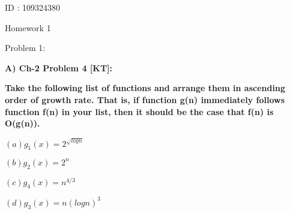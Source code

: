 \documentclass[letterpaper,portrait,12pt]{article}
\begin{document}
\begin{center}
{\huge ID : 109324380}
\end{center}


\begin{center}
{\huge \newpage
}
\end{center}


\begin{center}

\end{center}


\begin{center}
{\huge Homework 1}
\end{center}


\begin{flushleft}
Problem 1:
\end{flushleft}


\begin{flushleft}

\end{flushleft}


\begin{flushleft}
\textbf{A) Ch-2 Problem 4 [KT]:}
\end{flushleft}


\begin{flushleft}
\textbf{	Take the following list of functions and arrange them in ascending order of growth rate. That is, if function g(n) immediately follows function f(n) in your list, then it should be the case that f(n) is O(g(n)).}
\end{flushleft}


\begin{flushleft}

\end{flushleft}


\begin{flushleft}
$(a)g_1(x)=2^\sqrt{logn} 
$
\end{flushleft}


\begin{flushleft}
$(b)g_2(x)=2^n 
$
\end{flushleft}


\begin{flushleft}
$(c)g_4(x)=n^{4/3}



$
\end{flushleft}


\begin{flushleft}
$(d)g_3(x)=n(logn)^3$
\end{flushleft}
\end{document}
